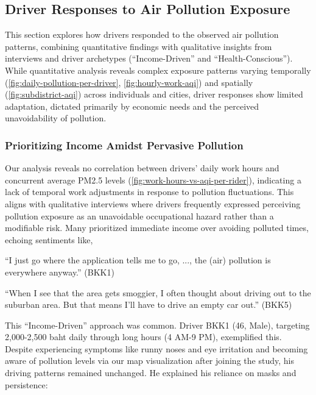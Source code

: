 \subsection{Driver Responses to Air Pollution Exposure}
This section explores how drivers responded to the observed air pollution patterns, combining quantitative findings with qualitative insights from interviews and driver archetypes (``Income-Driven'' and ``Health-Conscious'').
While quantitative analysis reveals complex exposure patterns varying temporally (\autoref{fig:daily-pollution-per-driver}, \autoref{fig:hourly-work-aqi}) and spatially (\autoref{fig:subdistrict-aqi}) across individuals and cities,
driver responses show limited adaptation, dictated primarily by economic needs and the perceived unavoidability of pollution.

\subsubsection{Prioritizing Income Amidst Pervasive Pollution}
Our analysis reveals no correlation between drivers' daily work hours and concurrent average PM2.5 levels (\autoref{fig:work-hours-vs-aqi-per-rider}), indicating a lack of temporal work adjustments in response to pollution fluctuations.
This aligns with qualitative interviews where drivers frequently expressed perceiving pollution exposure as an unavoidable occupational hazard rather than a modifiable risk.
Many prioritized immediate income over avoiding polluted times, echoing sentiments like,

\begin{quoteb}
    ``I just go where the application tells me to go, ..., the (air) pollution is everywhere anyway.'' (BKK1)
\end{quoteb}

\begin{quoteb}
    ``When I see that the area gets smoggier, I often thought about driving out to the suburban area. But that means I'll have to drive an empty car out.'' (BKK5)
\end{quoteb}

This ``Income-Driven'' approach was common.
Driver BKK1 (46, Male), targeting 2,000-2,500 baht daily through long hours (4 AM-9 PM), exemplified this.
Despite experiencing symptoms like runny noses and eye irritation and becoming aware of pollution levels via our map visualization after joining the study, his driving patterns remained unchanged.
He explained his reliance on masks and persistence:

